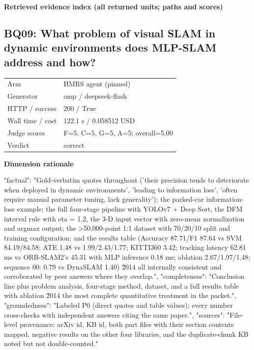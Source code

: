 \documentclass[10pt]{article}
\begin{document}
\textbf{Retrieved evidence index (all returned units; paths and scores) }
\begin{EvidenceText}
\end{EvidenceText}
\subsection{BQ09: What problem of visual SLAM in dynamic environments does MLP-SLAM address and how?}
\begin{tabular}{@{}ll@{}}
Arm & HMRS agent (pinned)\\
Generator & omp / deepseek-flash\\
HTTP / success & 200 / True\\
Wall time / cost & 122.1 s / 0.058512 USD\\
Judge scores & F=5, C=5, G=5, A=5; overall=5.00\\
Verdict & correct\\
\end{tabular}

\textbf{Dimension rationale}
\begin{EvidenceText}
{
  "factual": "Gold-verbatim quotes throughout ('their precision tends to deteriorate when deployed in dynamic environments', 'leading to information loss', 'often require manual parameter tuning, lack generality'); the parked-car information-loss example; the full four-stage pipeline with YOLOv7 + Deep Sort, the DFM interval rule with eta = 1.2, the 3-D input vector with zero-mean normalization and argmax output; the >50,000-point 1:1 dataset with 70/20/10 split and training configuration; and the results table (Accuracy 87.71/F1 87.64 vs SVM 84.19/84.58; ATE 1.48 vs 1.99/2.43/1.77; KITTI360 3.42; tracking latency 62.81 ms vs ORB-SLAM2's 45.31 with MLP inference 0.18 ms; ablation 2.67/1.97/1.48; sequence 00: 0.79 vs DynaSLAM 1.40) \u2014 all internally consistent and corroborated by peer answers where they overlap.",
  "completeness": "Conclusion line plus problem analysis, four-stage method, dataset, and a full results table with ablation \u2014 the most complete quantitative treatment in the packet.",
  "groundedness": "Labeled P0 (direct quotes and table values); every number cross-checks with independent answers citing the same paper.",
  "sources": "File-level provenance: arXiv id, KB id, both part files with their section contents mapped, negative results on the other four libraries, and the duplicate-chunk KB noted but not double-counted."
}
\end{EvidenceText}
\end{document}
